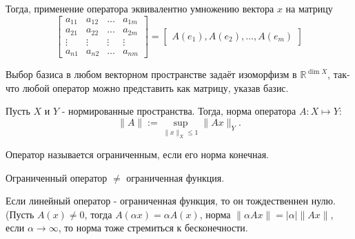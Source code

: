 Тогда, применение оператора эквивалентно умножению вектора $x$ на матрицу
\begin{equation*}
    \begin{bmatrix} 
        a_{11} & a_{12} & \ldots & a_{1m}\\
        a_{21} & a_{22} & \ldots & a_{2m}\\
        \vdots & \vdots & \vdots & \vdots\\
        a_{n1} & a_{n2} & \ldots & a_{nm}
        \end{bmatrix} = \begin{bmatrix} A(e_1), A(e_{2}), \ldots, A(e_{m}) \end{bmatrix} 
\end{equation*}
\begin{remark_author} \thmslashn

    Выбор базиса в любом векторном пространстве задаёт изоморфизм в $\mathbb{R}^{\dim X}$, так-что любой оператор можно представить как матрицу, указав базис.
\end{remark_author}
\begin{definition} \thmslashn 

Пусть $X$ и $Y$ - нормированные пространства. Тогда, норма оператора $A : X \mapsto Y$:
\[ \|A \| := \sup\limits_{\|x\|_{X} \le 1} \|Ax\|_{Y} .\] 
\end{definition}
\begin{definition} \thmslashn 

Оператор называется ограниченным, если его норма конечная.
\end{definition}
\begin{remark} \thmslashn

    Ограниченный оператор $\neq $ ограниченная функция.

    Если линейный оператор - ограниченная функция, то он тождественнен нулю. (Пусть $A(x) \neq 0$, тогда $A(\alpha x) = \alpha A(x)$, норма $\|\alpha Ax\| = |\alpha| \|Ax\|$, если $\alpha \to \infty$, то норма тоже стремиться к бесконечности.
\end{remark}
